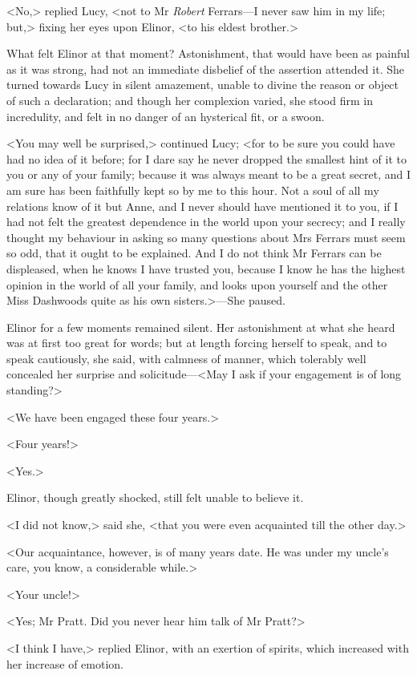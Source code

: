 <No,> replied Lucy, <not to Mr \textit{Robert} Ferrars—I never saw him in my life; but,> fixing her eyes upon Elinor, <to his eldest brother.>

What felt Elinor at that moment? Astonishment, that would have been as painful as it was strong, had not an immediate disbelief of the assertion attended it. She turned towards Lucy in silent amazement, unable to divine the reason or object of such a declaration; and though her complexion varied, she stood firm in incredulity, and felt in no danger of an hysterical fit, or a swoon.

<You may well be surprised,> continued Lucy; <for to be sure you could have had no idea of it before; for I dare say he never dropped the smallest hint of it to you or any of your family; because it was always meant to be a great secret, and I am sure has been faithfully kept so by me to this hour. Not a soul of all my relations know of it but Anne, and I never should have mentioned it to you, if I had not felt the greatest dependence in the world upon your secrecy; and I really thought my behaviour in asking so many questions about Mrs Ferrars must seem so odd, that it ought to be explained. And I do not think Mr Ferrars can be displeased, when he knows I have trusted you, because I know he has the highest opinion in the world of all your family, and looks upon yourself and the other Miss Dashwoods quite as his own sisters.>—She paused.

Elinor for a few moments remained silent. Her astonishment at what she heard was at first too great for words; but at length forcing herself to speak, and to speak cautiously, she said, with calmness of manner, which tolerably well concealed her surprise and solicitude—<May I ask if your engagement is of long standing?>

<We have been engaged these four years.>

<Four years!>

<Yes.>

Elinor, though greatly shocked, still felt unable to believe it.

<I did not know,> said she, <that you were even acquainted till the other day.>

<Our acquaintance, however, is of many years date. He was under my uncle's care, you know, a considerable while.>

<Your uncle!>

<Yes; Mr Pratt. Did you never hear him talk of Mr Pratt?>

<I think I have,> replied Elinor, with an exertion of spirits, which increased with her increase of emotion.

